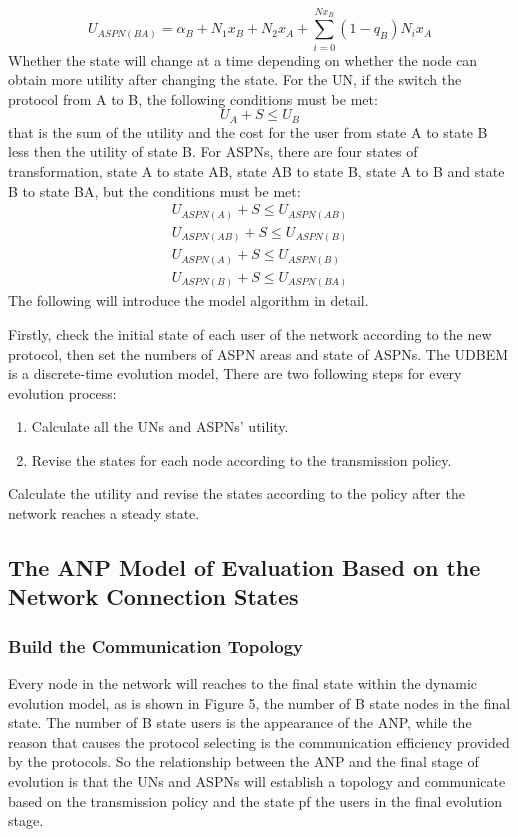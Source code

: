 \documentclass{article}
\begin{document}
\begin{displaymath}
U_{ASPN(BA)}=\alpha_{B}+N_{1}x_{B}+N_{2}x_{A}+\sum_{i=0}^{Nx_{B}}(1-q_{B})N_{i}x_{A}
\end{displaymath}
Whether the state will change at a time depending on whether the node can obtain more utility after changing the state.
For the UN, if the switch the protocol from A to B, the following conditions must be met:
\begin{displaymath}
U_{A}+S\leq U_{B}
\end{displaymath}
that is the sum of the utility and the cost for the user from state A to state B less then the utility of state B.
For ASPNs, there are four states of transformation, state A to state AB, state AB to state B, state A to B and state B
to state BA, but the conditions must be met:
\begin{equation}
\begin{aligned}
U_{ASPN(A)}+S \leq U_{ASPN(AB)}\\
U_{ASPN(AB)}+S \leq U_{ASPN(B)}\\
U_{ASPN(A)}+S \leq U_{ASPN(B)}\\
U_{ASPN(B)}+S \leq U_{ASPN(BA)}
\end{aligned}
\end{equation}
The following will introduce the model algorithm in detail.

Firstly, check the initial state of each user of the network according to the new protocol, then set the numbers of
ASPN areas and state of ASPNs. The UDBEM is a discrete-time evolution model, There are two following steps for
every evolution process:
\begin{enumerate}
    \item Calculate all the UNs and ASPNs' utility.
    \item Revise the states for each node according to the transmission policy.
\end{enumerate}
Calculate the utility and revise the states according to the policy after the network reaches a steady state.

\subsection{The ANP Model of Evaluation Based on the Network Connection States}

\subsubsection{Build the Communication Topology}
Every node in the network will reaches to the final state within the dynamic evolution model, as is shown in Figure 5,
the number of B state nodes in the final state. The number of B state users is the appearance of the ANP, while the
reason that causes the protocol selecting is the communication efficiency provided by the protocols. So the relationship
between the ANP and the final stage of evolution is that the UNs and ASPNs will establish a topology and communicate
based on the transmission policy and the state pf the users in the final evolution stage.
\par
\end{document}
